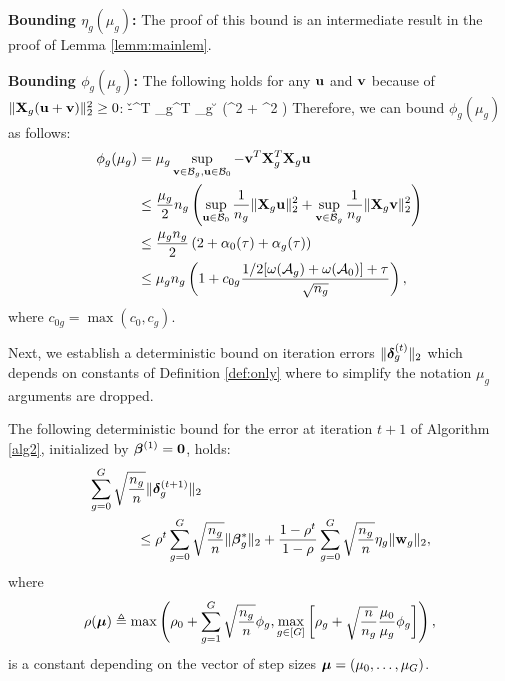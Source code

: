 \begin{IEEEproof}
		\noindent \textbf{Bounding $\eta_g(\mu_g)$:}
			The proof of this bound is an intermediate result in the proof of Lemma \ref{lemm:mainlem}.
		
		\noindent \textbf{Bounding $\phi_g(\mu_g)$:}
			The following holds for any $\mathbf{u}$ and $\mathbf{v}$ because of $\|\mathbf{X}_g (\mathbf{u} + \mathbf{v})\|_{2}^2 \geq 0$:
			\be 
			\nr 
			-\v^T \X_g^T \X_g \u \leq {} \left(^2 + ^2 \right)
			\ee 
			Therefore, we can bound $\phi_g(\mu_g)$ as follows:	 
			\begin{align}
			\nr  
			\phi_g(\mu_g) &= \mu_g \sup_{\v \in \cB_g, \u \in \cB_0} -\v^T \X_g^T \X_g \u 
			\\ \nr 
			&\leq \frac{\mu_g}{2} n_g \left(\sup_{\u \in \cB_0} \frac{1}{n_g} \norm{\X_g \u}{2}^2 
			+ \sup_{\v \in \cB_g} \frac{1}{n_g} \norm{\X_g \v}{2}^2 \right)
			\\ \nr 
			&\leq \frac{\mu_g n_g}{2} \left(2 + \alpha_0(\tau) + \alpha_g(\tau) \right)
			\\ \nr 
			&\leq \mu_g n_g \left(1 + c_{0g} \frac{1/2 [\omega(\cA_g) + \omega(\cA_0)] + \tau}{\sqrt{n_g}} \right), 
			\end{align}
			where $c_{0g} = \max(c_0, c_g)$. 		
\end{IEEEproof}
Next, we establish a deterministic bound on iteration errors  $\|\boldsymbol{\delta}_g^{(t)}\|_{2}$ which depends on constants of Definition \ref{def:only} where to simplify the notation $\mu_g$ arguments are dropped. 
\begin{lemma}
	\label{theo:iter}
	The following deterministic bound for the error at iteration $t + 1$ of Algorithm \ref{alg2}, initialized by $\boldsymbol{\beta} ^{(1)} = \mathbf{0}$, holds:
	\begin{align} \label{eq:singleiter}
	&\sum_{g=0}^{G} \sqrt{\frac{n_g}{n}} \norm{\ddelta_g^{(t+1)}}{2}
	\\ \nr 
	&\hspace*{1.2cm}\leq \rho^t \sum_{g=0}^{G}\sqrt{\frac{n_g}{n}}\norm{\bbeta ^*_g}{2}   + \frac{1 - \rho^t}{1 -  \rho}   \sum_{g=0}^{G} \sqrt{\frac{n_g}{n}} \eta_g \norm{\w_g}{2},
	\end{align}
	where $$\rho(\boldsymbol{\mu}) \triangleq \max\left(\rho_0 + \sum_{g=1}^{G} \sqrt{\frac{n_g}{n}} \phi_g, \max_{g \in [G]} \left[\rho_g + \sqrt{\frac{n}{n_g}}  \frac{\mu_0}{\mu_g} \phi_g \right]  \right),$$ is a constant depending on the vector of step sizes $\boldsymbol{\mu} = (\mu_0, \dots, \mu_G)$.
\end{lemma}

